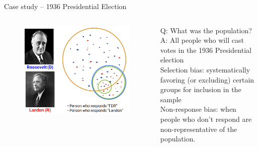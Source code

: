 \documentclass[aspectratio=169]{../latex_main/tntbeamer}  %
\begin{document}
	\begin{frame}{Case study – 1936 Presidential Election}
	    \begin{columns}
	        \begin{column}{.6\textwidth}
	           \begin{figure}
	               \includegraphics[scale=.33]{Bild7}
	           \end{figure}
	        \end{column}
	        
	        \begin{column}{.4\textwidth}
	            Q: What was the population?\\
	            A: All people who will cast votes in the 1936 Presidential election\\
	            \bigskip
	            Selection bias: systematically favoring (or excluding) certain groups for inclusion in the sample\\
	            \bigskip
	            Non-response bias: when people who don’t respond are non-representative of the population.

	        \end{column}
	        
	    \end{columns}
	    
	\end{frame}
	
	
	
\end{document}
